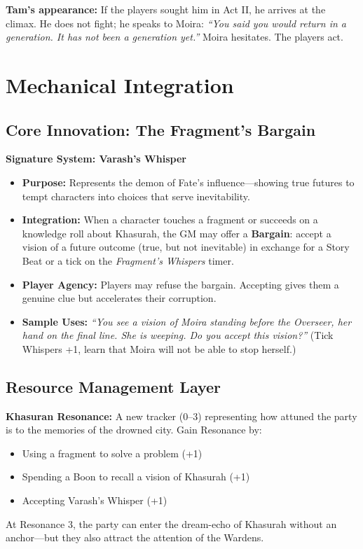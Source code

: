 \documentclass[11pt]{article}
\begin{document}
\textbf{Tam's appearance:} If the players sought him in Act II, he arrives at the climax. He does not fight; he speaks to Moira: \textit{``You said you would return in a generation. It has not been a generation yet.''} Moira hesitates. The players act.

\section{Mechanical Integration}

\subsection{Core Innovation: The Fragment's Bargain}

\textbf{Signature System: Varash's Whisper}
\begin{itemize}
    \item \textbf{Purpose:} Represents the demon of Fate's influence---showing true futures to tempt characters into choices that serve inevitability.
    \item \textbf{Integration:} When a character touches a fragment or succeeds on a knowledge roll about Khasurah, the GM may offer a \textbf{Bargain}: accept a vision of a future outcome (true, but not inevitable) in exchange for a Story Beat or a tick on the \textit{Fragment's Whispers} timer.
    \item \textbf{Player Agency:} Players may refuse the bargain. Accepting gives them a genuine clue but accelerates their corruption.
    \item \textbf{Sample Uses:} \textit{``You see a vision of Moira standing before the Overseer, her hand on the final line. She is weeping. Do you accept this vision?''} (Tick Whispers +1, learn that Moira will not be able to stop herself.)
\end{itemize}

\subsection{Resource Management Layer}

\textbf{Khasuran Resonance:} A new tracker (0--3) representing how attuned the party is to the memories of the drowned city. Gain Resonance by:
\begin{itemize}
    \item Using a fragment to solve a problem (+1)
    \item Spending a Boon to recall a vision of Khasurah (+1)
    \item Accepting Varash's Whisper (+1)
\end{itemize}
At Resonance 3, the party can enter the dream-echo of Khasurah without an anchor---but they also attract the attention of the Wardens.
\end{document}
